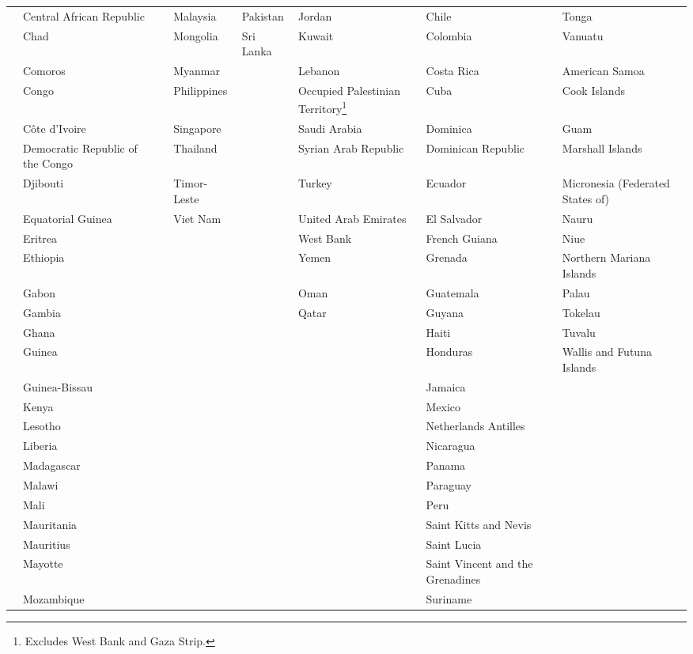 \begin{longtable}{p{1.6cm}p{2cm}p{1.3cm}p{2.8cm}p{1.5cm}p{2.2cm}p{3cm}p{2cm}}
   & Central African Republic &  & Malaysia & Pakistan & Jordan & Chile & Tonga \\ 
   & Chad &  & Mongolia & Sri Lanka & Kuwait & Colombia & Vanuatu \\ 
   & Comoros &  & Myanmar &  & Lebanon & Costa Rica & American Samoa \\ 
   & Congo &  & Philippines &  & Occupied Palestinian Territory\footnote{Excludes West Bank and Gaza Strip.} & Cuba & Cook Islands \\ 
   & Côte d'Ivoire &  & Singapore &  & Saudi Arabia & Dominica & Guam \\ 
   & Democratic Republic of the Congo &  & Thailand &  & Syrian Arab Republic & Dominican Republic & Marshall Islands \\ 
   & Djibouti &  & Timor-Leste &  & Turkey & Ecuador & Micronesia (Federated States of) \\ 
   & Equatorial Guinea &  & Viet Nam &  & United Arab Emirates & El Salvador & Nauru \\ 
   & Eritrea &  &  &  & West Bank & French Guiana & Niue \\ 
   & Ethiopia &  &  &  & Yemen & Grenada & Northern Mariana Islands \\ 
   & Gabon &  &  &  & Oman & Guatemala & Palau \\ 
   & Gambia &  &  &  & Qatar & Guyana & Tokelau \\ 
   & Ghana &  &  &  &  & Haiti & Tuvalu \\ 
   & Guinea &  &  &  &  & Honduras & Wallis and Futuna Islands \\ 
   & Guinea-Bissau &  &  &  &  & Jamaica &  \\ 
   & Kenya &  &  &  &  & Mexico &  \\ 
   & Lesotho &  &  &  &  & Netherlands Antilles &  \\ 
   & Liberia &  &  &  &  & Nicaragua &  \\ 
   & Madagascar &  &  &  &  & Panama &  \\ 
   & Malawi &  &  &  &  & Paraguay &  \\ 
   & Mali &  &  &  &  & Peru &  \\ 
   & Mauritania &  &  &  &  & Saint Kitts and Nevis &  \\ 
   & Mauritius &  &  &  &  & Saint Lucia &  \\ 
   & Mayotte &  &  &  &  & Saint Vincent and the Grenadines &  \\ 
   & Mozambique &  &  &  &  & Suriname &  \\ 

\end{longtable}
